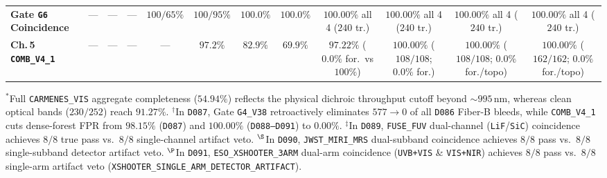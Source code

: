 \documentclass[twocolumn,10pt]{article}
\begin{document}
\begin{table}[t]
{\begin{tabular}{lccccccccccc}
\textbf{Gate \texttt{G6} Coincidence} & --- & --- & --- & $100/65\%$ & $100/95\%$ & $\mathbf{100.0\%}$ & $\mathbf{100.0\%}$ & $\mathbf{100.00\%}$ all 4 ($240$ tr.) & $\mathbf{100.00\%}$ all 4 ($240$ tr.) & $\mathbf{100.00\%}$ all 4 ($240$ tr.) & $\mathbf{100.00\%}$ all 4 ($240$ tr.) \\
\textbf{Ch.\,5 \texttt{COMB\_V4\_1}} & --- & --- & --- & --- & $97.2\%$ & $82.9\%$ & $69.9\%$ & $\mathbf{97.22\%}$ ($\mathbf{0.0\%}$ for.\ vs $100\%$) & $\mathbf{100.00\%}$ ($108/108$; $\mathbf{0.0\%}$ for.) & $\mathbf{100.00\%}$ ($108/108$; $\mathbf{0.0\%}$ for./topo) & $\mathbf{100.00\%}$ ($162/162$; $\mathbf{0.0\%}$ for./topo) \\
\bottomrule
\end{tabular}%
}
\par\smallskip\scriptsize{$^{\ast}$Full \texttt{CARMENES\_VIS} aggregate completeness ($54.94\%$) reflects the physical dichroic throughput cutoff beyond $\sim 995\,\text{nm}$, whereas clean optical bands ($230/252$) reach $91.27\%$. $^{\dagger}$In \texttt{D087}, Gate \texttt{G4\_V38} retroactively eliminates $577 \rightarrow 0$ of all \texttt{D086} Fiber-B bleeds, while \texttt{COMB\_V4\_1} cuts dense-forest FPR from $98.15\%$ (\texttt{D087}) and $100.00\%$ (\texttt{D088--D091}) to $0.00\%$. $^{\ddagger}$In \texttt{D089}, \texttt{FUSE\_FUV} dual-channel (\texttt{LiF}/\texttt{SiC}) coincidence achieves $8/8$ true pass vs.\ $8/8$ single-channel artifact veto. $^{\S}$In \texttt{D090}, \texttt{JWST\_MIRI\_MRS} dual-subband coincidence achieves $8/8$ pass vs.\ $8/8$ single-subband detector artifact veto. $^{\P}$In \texttt{D091}, \texttt{ESO\_XSHOOTER\_3ARM} dual-arm coincidence (\texttt{UVB+VIS} \& \texttt{VIS+NIR}) achieves $8/8$ pass vs.\ $8/8$ single-arm artifact veto (\texttt{XSHOOTER\_SINGLE\_ARM\_DETECTOR\_ARTIFACT}).}
\end{table}
\end{document}
